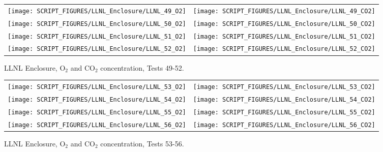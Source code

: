 \begin{figure}[p]
\begin{tabular*}{\textwidth}{l@{\extracolsep{\fill}}r}
\texttt{[image: SCRIPT\_FIGURES/LLNL\_Enclosure/LLNL\_49\_O2]} &
\texttt{[image: SCRIPT\_FIGURES/LLNL\_Enclosure/LLNL\_49\_CO2]} \\
\texttt{[image: SCRIPT\_FIGURES/LLNL\_Enclosure/LLNL\_50\_O2]} &
\texttt{[image: SCRIPT\_FIGURES/LLNL\_Enclosure/LLNL\_50\_CO2]} \\
\texttt{[image: SCRIPT\_FIGURES/LLNL\_Enclosure/LLNL\_51\_O2]} &
\texttt{[image: SCRIPT\_FIGURES/LLNL\_Enclosure/LLNL\_51\_CO2]} \\
\texttt{[image: SCRIPT\_FIGURES/LLNL\_Enclosure/LLNL\_52\_O2]} &
\texttt{[image: SCRIPT\_FIGURES/LLNL\_Enclosure/LLNL\_52\_CO2]}
\end{tabular*}
\caption[LLNL Enclosure, O$_2$ and CO$_2$ concentration, Tests 49-52]{LLNL Enclosure, O$_2$ and CO$_2$ concentration, Tests 49-52.}
\label{LLNL_Gas_13}
\end{figure}

\begin{figure}[p]
\begin{tabular*}{\textwidth}{l@{\extracolsep{\fill}}r}
\texttt{[image: SCRIPT\_FIGURES/LLNL\_Enclosure/LLNL\_53\_O2]} &
\texttt{[image: SCRIPT\_FIGURES/LLNL\_Enclosure/LLNL\_53\_CO2]} \\
\texttt{[image: SCRIPT\_FIGURES/LLNL\_Enclosure/LLNL\_54\_O2]} &
\texttt{[image: SCRIPT\_FIGURES/LLNL\_Enclosure/LLNL\_54\_CO2]} \\
\texttt{[image: SCRIPT\_FIGURES/LLNL\_Enclosure/LLNL\_55\_O2]} &
\texttt{[image: SCRIPT\_FIGURES/LLNL\_Enclosure/LLNL\_55\_CO2]} \\
\texttt{[image: SCRIPT\_FIGURES/LLNL\_Enclosure/LLNL\_56\_O2]} &
\texttt{[image: SCRIPT\_FIGURES/LLNL\_Enclosure/LLNL\_56\_CO2]}
\end{tabular*}
\caption[LLNL Enclosure, O$_2$ and CO$_2$ concentration, Tests 53-56]{LLNL Enclosure, O$_2$ and CO$_2$ concentration, Tests 53-56.}
\label{LLNL_Gas_14}
\end{figure}

